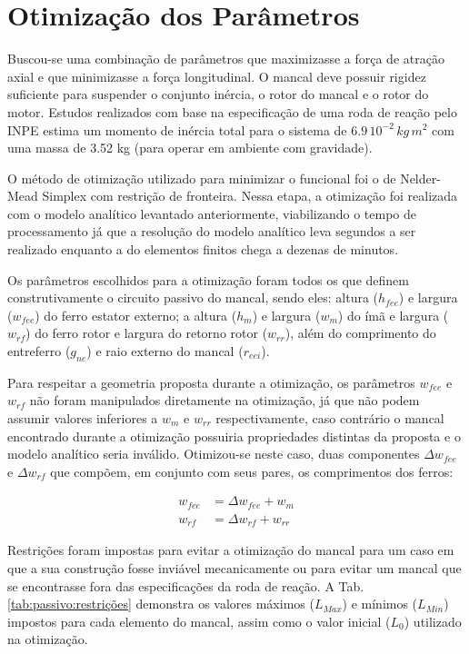 \section{Otimização dos Parâmetros}

Buscou-se uma combinação de parâmetros que maximizasse a força de atração axial e que minimizasse a força longitudinal. O mancal deve possuir rigidez suficiente para suspender o conjunto inércia, o rotor do mancal e o rotor do motor. Estudos realizados com base na especificação de uma roda de reação pelo INPE estima um momento de inércia total para o sistema de $6.9 \, 10^{-2} \, kg \, m^2$ com uma massa de 3.52 kg (para operar em ambiente com gravidade). 

O método de otimização utilizado para minimizar o funcional foi o de Nelder-Mead Simplex com restrição de fronteira. Nessa etapa, a otimização foi realizada com o modelo analítico levantado anteriormente, viabilizando o tempo de processamento já que a resolução do modelo analítico leva segundos a ser realizado enquanto a do elementos finitos chega a dezenas de minutos.

Os parâmetros escolhidos para a otimização foram todos os que definem construtivamente o circuito passivo do mancal, sendo eles: altura  ($h_{fee}$) e largura  ($w_{fee}$) do ferro estator externo; a altura ($h_m$) e largura ($w_m$) do ímã e largura ($w_{rf}$) do ferro rotor e largura do retorno rotor ($w_{rr}$), além do comprimento do entreferro ($g_{ne}$) e raio externo do mancal ($r_{eei}$).

Para respeitar a geometria proposta durante a otimização, os parâmetros $w_{fee}$ e $w_{rf}$ não foram manipulados diretamente na otimização, já que não podem assumir valores inferiores a $w_m$ e $w_{rr}$ respectivamente, caso contrário o mancal encontrado durante a otimização possuiria propriedades distintas da proposta e o modelo analítico seria inválido. Otimizou-se neste caso, duas componentes $\Delta w_{fee}$ e $\Delta w_{rf}$ que compõem, em conjunto com seus pares, os comprimentos dos ferros:

\begin{align}
w_{fee}  &= \Delta w_{fee} + w_m \\
w_{rf} &= \Delta w_{rf} + w_{rr}
\end{align}	

Restrições foram impostas para evitar a otimização do mancal para um caso em que a sua construção fosse inviável mecanicamente ou para evitar um mancal que se encontrasse fora das especificações da roda de reação. A Tab. \ref{tab:passivo:restrições} demonstra os valores máximos ($L_{Max}$) e mínimos ($L_{Min}$) impostos para cada elemento do mancal, assim como o valor inicial ($L_0$) utilizado na otimização.


